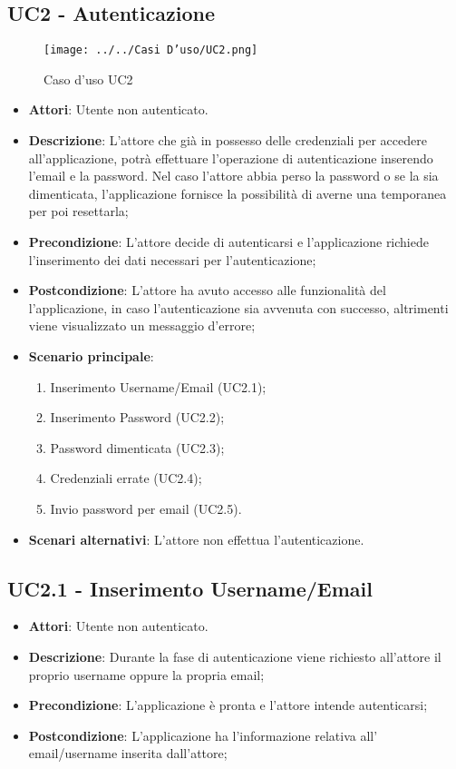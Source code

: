 \subsection{UC2 - Autenticazione} 
\label{ssec:UC2} 
\begin{figure}[h!] 
\centering 
\texttt{[image: ../../Casi D'uso/UC2.png]} 
\caption{Caso d'uso UC2} 
 \end{figure} 
\begin{itemize} 
\item \textbf{Attori}: Utente non autenticato.
\item \textbf{Descrizione}: L'attore che già in possesso delle credenziali per accedere all'applicazione, potrà effettuare l'operazione di autenticazione inserendo l'email e la password. Nel caso l’attore abbia perso la password o se la sia dimenticata, l'applicazione fornisce la possibilità di averne una temporanea per poi resettarla;
\item \textbf{Precondizione}: L'attore decide di autenticarsi e l'applicazione richiede l'inserimento dei dati necessari per l'autenticazione;
\item \textbf{Postcondizione}: L'attore ha avuto accesso alle funzionalità del l'applicazione, in caso l'autenticazione sia avvenuta con successo, altrimenti viene visualizzato un messaggio d'errore;
\item \textbf{Scenario principale}: \begin{enumerate}\item Inserimento Username/Email (UC2.1);\item Inserimento Password (UC2.2);\item Password dimenticata (UC2.3);\item Credenziali errate (UC2.4);\item Invio password per email (UC2.5). 
 \end{enumerate}
\item \textbf{Scenari alternativi}: L’attore non effettua l’autenticazione.
\end{itemize} 
\subsection{UC2.1 - Inserimento Username/Email} 
\label{ssec:UC2.1} 
\begin{itemize} 
\item \textbf{Attori}: Utente non autenticato.
\item \textbf{Descrizione}: Durante la fase di autenticazione viene richiesto all'attore il proprio username oppure la propria email;
\item \textbf{Precondizione}: L'applicazione è pronta e l'attore intende autenticarsi;
\item \textbf{Postcondizione}: L'applicazione ha l’informazione relativa all' email/username inserita dall’attore;
\end{itemize} 
